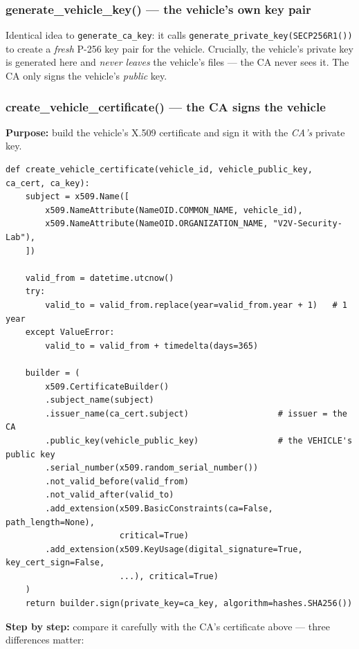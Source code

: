 \documentclass[11pt,a4paper]{report}
\begin{document}
\subsubsection*{generate\_vehicle\_key() --- the vehicle's own key pair}
Identical idea to \texttt{generate\_ca\_key}: it calls
\texttt{generate\_private\_key(SECP256R1())} to create a \emph{fresh} P-256 key
pair for the vehicle. Crucially, the vehicle's private key is generated here and
\emph{never leaves} the vehicle's files --- the CA never sees it. The CA only
signs the vehicle's \emph{public} key.

\subsubsection*{create\_vehicle\_certificate() --- the CA signs the vehicle}
\textbf{Purpose:} build the vehicle's X.509 certificate and sign it with the
\emph{CA's} private key.
\begin{lstlisting}[style=py,caption={ca/issue\_cert.py --- build and CA-sign a vehicle certificate.}]
def create_vehicle_certificate(vehicle_id, vehicle_public_key, ca_cert, ca_key):
    subject = x509.Name([
        x509.NameAttribute(NameOID.COMMON_NAME, vehicle_id),
        x509.NameAttribute(NameOID.ORGANIZATION_NAME, "V2V-Security-Lab"),
    ])

    valid_from = datetime.utcnow()
    try:
        valid_to = valid_from.replace(year=valid_from.year + 1)   # 1 year
    except ValueError:
        valid_to = valid_from + timedelta(days=365)

    builder = (
        x509.CertificateBuilder()
        .subject_name(subject)
        .issuer_name(ca_cert.subject)                  # issuer = the CA
        .public_key(vehicle_public_key)                # the VEHICLE's public key
        .serial_number(x509.random_serial_number())
        .not_valid_before(valid_from)
        .not_valid_after(valid_to)
        .add_extension(x509.BasicConstraints(ca=False, path_length=None),
                       critical=True)
        .add_extension(x509.KeyUsage(digital_signature=True, key_cert_sign=False,
                       ...), critical=True)
    )
    return builder.sign(private_key=ca_key, algorithm=hashes.SHA256())
\end{lstlisting}
\textbf{Step by step:} compare it carefully with the CA's certificate above ---
three differences matter:
\end{document}
